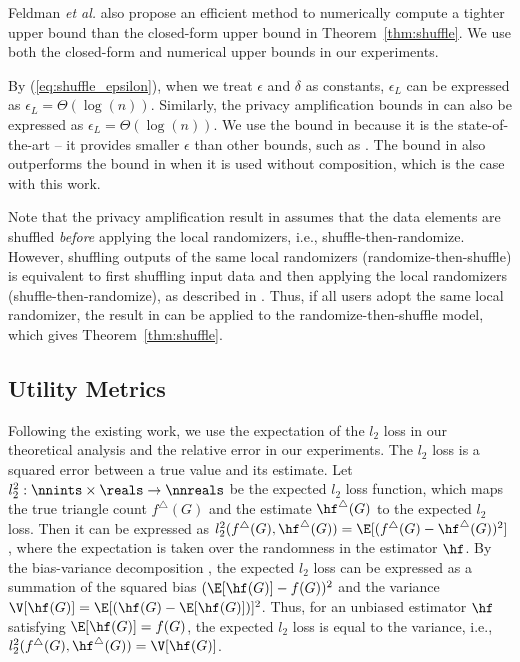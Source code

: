 Feldman \textit{et al.} \cite{Feldman_FOCS21} also propose an efficient method to numerically compute a tighter upper bound than the closed-form upper bound in Theorem~\ref{thm:shuffle}. 
We use both the closed-form and numerical upper bounds in our experiments. 

By (\ref{eq:shuffle_epsilon}), when we treat $\epsilon$ and $\delta$ as constants, $\epsilon_L$ can be expressed as $\epsilon_L = \Theta(\log(n))$. 
Similarly, the privacy amplification bounds in \cite{Balle_CRYPTO19,Cheu_EUROCRYPT19} can also be expressed as $\epsilon_L = \Theta(\log(n))$. 
We use the bound in \cite{Feldman_FOCS21} because it is the state-of-the-art -- it provides smaller $\epsilon$ than other bounds, such as \cite{Balle_CRYPTO19,Cheu_EUROCRYPT19,Erlingsson_SODA19}. 
The bound in \cite{Feldman_FOCS21} also outperforms the bound in \cite{Girgis_CCS21} when it is used without composition, which is the case with this work. 

Note that the privacy amplification result in \cite{Feldman_FOCS21} assumes that the data elements are shuffled \textit{before} applying the local randomizers, i.e., shuffle-then-randomize. 
However, 
shuffling outputs of the same local randomizers (randomize-then-shuffle) 
is equivalent to first shuffling input data and then applying the local randomizers (shuffle-then-randomize), as described in \cite{Erlingsson_SODA19}. 
Thus, if all users adopt the same local randomizer, the result in \cite{Feldman_FOCS21} can be applied to the randomize-then-shuffle model, which gives Theorem~\ref{thm:shuffle}. 

\subsection{Utility Metrics}
\label{sub:utility}
Following the existing work, we use the expectation of the $l_2$ loss \cite{Kairouz_ICML16,Murakami_USENIX19,Wang_USENIX17} in our theoretical analysis and the relative error \cite{Bindschaedler_SP16,Chen_CCS12,Xiao_SIGMOD11} in our experiments. 
The $l_2$ loss is a squared error between a true value and its estimate. 
Let 
$l_2^2: \nnints \times \reals \rightarrow \nnreals$ 
be the expected $l_2$ loss function, which maps the true triangle count $f^\triangle(G)$ and the estimate $\hf^\triangle(G)$ to the expected $l_2$ loss. 
Then it can be expressed as $l_2^2(f^\triangle(G), \hf^\triangle(G)) = \E[(f^\triangle(G) - \hf^\triangle(G))^2]$, where the expectation is taken over the randomness in the estimator $\hf$. 
By the bias-variance decomposition \cite{mlpp}, the expected $l_2$ loss can be expressed as a summation of the squared bias $(\E[\hf(G)] - f(G))^2$ and the variance $\V[\hf(G)] = \E[(\hf(G) - \E[\hf(G)])]^2$. 
Thus, for an unbiased estimator $\hf$ satisfying $\E[\hf(G)] = f(G)$, the expected $l_2$ loss is equal to the variance, i.e., $l_2^2(f^\triangle(G), \hf^\triangle(G)) = \V[\hf(G)]$. 

